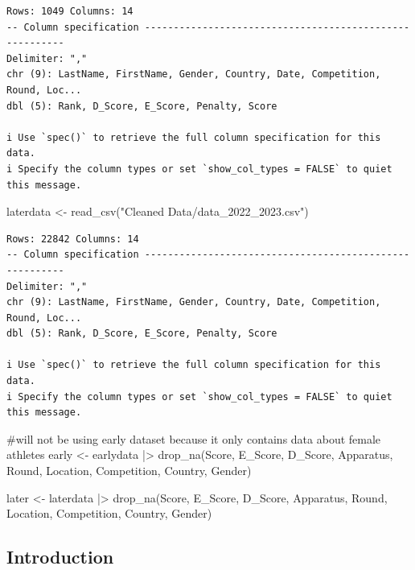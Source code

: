 \documentclass[
  letterpaper,
  DIV=11,
  numbers=noendperiod]{scrartcl}
\newenvironment{Shaded}{\begin{snugshade}}{\end{snugshade}}
\newcommand{\CommentTok}[1]{\textcolor[rgb]{0.37,0.37,0.37}{#1}}
\newcommand{\FunctionTok}[1]{\textcolor[rgb]{0.28,0.35,0.67}{#1}}
\newcommand{\NormalTok}[1]{\textcolor[rgb]{0.00,0.23,0.31}{#1}}
\newcommand{\OtherTok}[1]{\textcolor[rgb]{0.00,0.23,0.31}{#1}}
\newcommand{\SpecialCharTok}[1]{\textcolor[rgb]{0.37,0.37,0.37}{#1}}
\newcommand{\StringTok}[1]{\textcolor[rgb]{0.13,0.47,0.30}{#1}}
\begin{document}
\begin{verbatim}
Rows: 1049 Columns: 14
-- Column specification --------------------------------------------------------
Delimiter: ","
chr (9): LastName, FirstName, Gender, Country, Date, Competition, Round, Loc...
dbl (5): Rank, D_Score, E_Score, Penalty, Score

i Use `spec()` to retrieve the full column specification for this data.
i Specify the column types or set `show_col_types = FALSE` to quiet this message.
\end{verbatim}

\begin{Shaded}
\begin{Highlighting}[]
\NormalTok{laterdata }\OtherTok{\textless{}{-}} \FunctionTok{read\_csv}\NormalTok{(}\StringTok{"Cleaned Data/data\_2022\_2023.csv"}\NormalTok{)}
\end{Highlighting}
\end{Shaded}

\begin{verbatim}
Rows: 22842 Columns: 14
-- Column specification --------------------------------------------------------
Delimiter: ","
chr (9): LastName, FirstName, Gender, Country, Date, Competition, Round, Loc...
dbl (5): Rank, D_Score, E_Score, Penalty, Score

i Use `spec()` to retrieve the full column specification for this data.
i Specify the column types or set `show_col_types = FALSE` to quiet this message.
\end{verbatim}

\begin{Shaded}
\begin{Highlighting}[]
\CommentTok{\#will not be using early dataset because it only contains data about female athletes}
\NormalTok{early }\OtherTok{\textless{}{-}}\NormalTok{ earlydata }\SpecialCharTok{|\textgreater{}}
  \FunctionTok{drop\_na}\NormalTok{(Score, E\_Score, D\_Score, Apparatus, Round, Location, Competition, Country, Gender)}

\NormalTok{later }\OtherTok{\textless{}{-}}\NormalTok{ laterdata }\SpecialCharTok{|\textgreater{}}
  \FunctionTok{drop\_na}\NormalTok{(Score, E\_Score, D\_Score, Apparatus, Round, Location, Competition, Country, Gender)}
\end{Highlighting}
\end{Shaded}

\hypertarget{introduction}{%
\subsection{Introduction}\label{introduction}}
\end{document}

